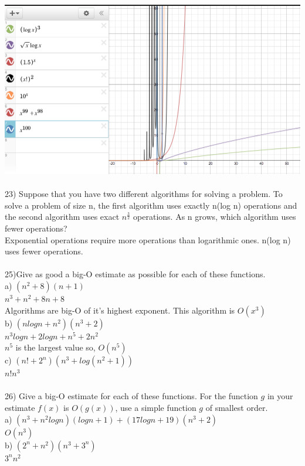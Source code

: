 \documentclass{article}
\begin{document}
\begin{flushleft}
~\\
\setlength\parindent{0pt}\includegraphics[width=\textwidth]{graph2.png} \\
~\\
\setlength\parindent{0pt}23) Suppose that you have two different algorithms for solving a problem.  To solve a problem of size n, the first algorithm uses exactly n(log n) operations and the second algorithm uses exact $n^{\frac{3}{2}}$ operations.  As n grows, which algorithm uses fewer operations? \\
\setlength\parindent{24pt} Exponential operations require more operations than logarithmic ones.  n(log n) uses fewer operations. \\
~\\
\setlength\parindent{0pt}25)Give as good a big-O estimate as possible for each of these functions. \\
\setlength\parindent{24pt}a) $(n^2 + 8)(n + 1)$ \\
\setlength\parindent{48pt} $n^3 + n^2 + 8n + 8$ \\ 
\setlength\parindent{48pt} Algorithms are big-O of it's highest exponent.  This algorithm is $O(x^3)$ \\
\setlength\parindent{24pt}b) $(n log n + n^2)(n^3 + 2)$\\
\setlength\parindent{48pt} $n^3 logn + 2logn + n^5 + 2n^2$ \\
\setlength\parindent{48pt} $n^5$ is the largest value so, $O(n^5)$\\
\setlength\parindent{24pt}c) $(n! + 2^n)(n^3 + log(n^2 + 1))$\\
\setlength\parindent{48pt}$n!n^3$ \\
~\\
\setlength\parindent{0pt}26) Give a big-O estimate for each of these functions.  For the function $g$ in your estimate $f(x)$ is $O(g(x))$, use a simple function $g$ of smallest order. \\
\setlength\parindent{24pt}a) $(n^3 + n^2logn)(logn + 1) + (17logn+19)(n^3 + 2)$ \\
\setlength\parindent{48pt} $O(n^3)$ \\
\setlength\parindent{24pt}b) $(2^n + n^2)(n^3 + 3^n)$ \\
\setlength\parindent{48pt} $3^{n}n^2$ 

\end{flushleft}
\end{document}
